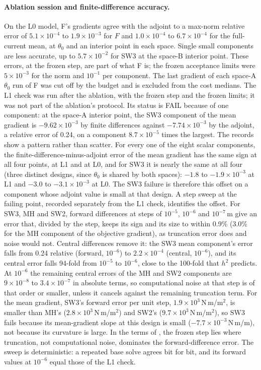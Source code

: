 \documentclass{anvil-paper}
\begin{document}
\paragraph{Ablation session and finite-difference accuracy.}
On the L0 model, F's gradients agree with the adjoint to a max-norm
relative error of $5.1\times10^{-4}$ to $1.9\times10^{-3}$ for $F$ and
$1.0\times10^{-4}$ to $6.7\times10^{-4}$ for the full-current mean, at
$\theta_0$ and an interior point in each space. Single small components are
less accurate, up to $5.7\times10^{-2}$ for SW3 at the space-B interior
point. These errors, at the frozen step, are part of what F is; the frozen
acceptance limits were $5\times10^{-3}$ for the norm and $10^{-1}$ per
component. The last gradient of each space-A $\theta_0$ run of F was cut
off by the budget and is excluded from the cost medians. The L1 check was
run after the ablation, with the frozen step
and the frozen limits; it was not part of the ablation's protocol. Its
status is FAIL because of one component: at the space-A interior point, the
SW3 component of the mean gradient is $-9.62\times10^{-3}$ by finite
differences against $-7.74\times10^{-3}$ by the adjoint, a relative error
of 0.24, on a component $8.7\times10^{-5}$ times the largest. The records
show a pattern rather than scatter. For every one of the eight scalar
components, the finite-difference-minus-adjoint error of the mean gradient
has the same sign at all four points, at L1 and at L0, and for SW3 it is
nearly the same at all four (three distinct designs, since $\theta_0$ is
shared by both spaces): $-1.8$ to $-1.9\times10^{-3}$ at L1 and $-3.0$ to
$-3.1\times10^{-3}$ at L0. The SW3 failure is therefore this offset on a component whose adjoint
value is small at that design. A step sweep at the failing point,
recorded separately from the L1 check, identifies the offset. For SW3, MH
and SW2, forward differences at steps of $10^{-5}$, $10^{-6}$ and
$10^{-7}$\,m give an error that, divided by the step, keeps its sign and
its size to within 0.9\% (3.0\% for the MH component of the objective
gradient), as truncation error does and noise would not. Central
differences remove it: the SW3 mean component's error falls from 0.24
relative (forward, $10^{-6}$) to $2.2\times10^{-4}$ (central, $10^{-6}$),
and its central error falls 94-fold from $10^{-5}$ to $10^{-6}$, close to
the 100-fold that $h^2$ predicts. At $10^{-6}$ the remaining central errors
of the MH and SW2 components are $9\times10^{-8}$ to $3.4\times10^{-7}$ in
absolute terms, so computational noise at that step is of that order or
smaller, unless it cancels against the remaining truncation term. For the
mean gradient, SW3's forward error per unit step, $1.9\times10^{3}$\,N\,m/m$^2$,
is smaller than MH's ($2.8\times10^{3}$\,N\,m/m$^2$) and SW2's
($9.7\times10^{3}$\,N\,m/m$^2$), so SW3 fails because its mean-gradient
slope at this design is small ($-7.7\times10^{-3}$\,N\,m/m), not because
its curvature is large. In the terms of \citet{more2011estimating,more2012estimating},
the frozen step lies where truncation, not computational noise, dominates
the forward-difference error. The sweep is deterministic: a repeated base
solve agrees bit for bit, and its forward values at $10^{-6}$ equal those of
the L1 check.
\end{document}
